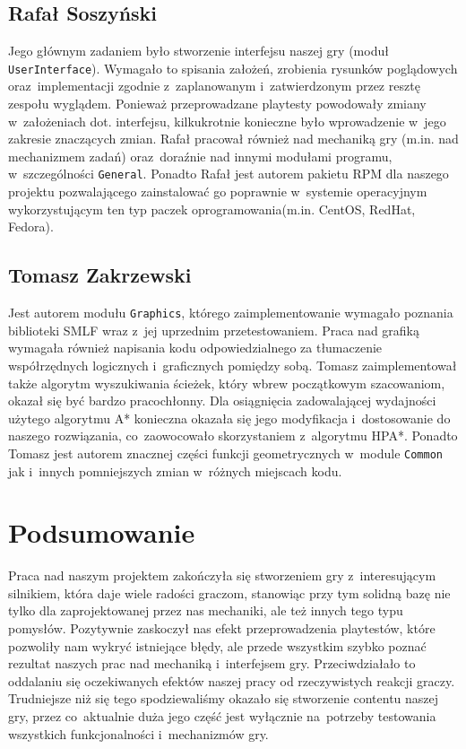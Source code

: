 \documentclass[licencjacka]{pracamgr}
\begin{document}
  \section{Rafał Soszyński}
    Jego głównym zadaniem było stworzenie interfejsu naszej gry (moduł \texttt{UserInterface}). Wymagało to spisania
    założeń, zrobienia rysunków poglądowych oraz~implementacji zgodnie z~zaplanowanym i~zatwierdzonym przez resztę zespołu
    wyglądem. Ponieważ przeprowadzane playtesty powodowały zmiany w~założeniach dot. interfejsu, kilkukrotnie konieczne
    było wprowadzenie w~jego zakresie znaczących zmian. Rafał pracował również nad mechaniką gry (m.in. nad mechanizmem
    zadań) oraz~doraźnie nad innymi modułami programu, w~szczególności \texttt{General}. Ponadto Rafał jest autorem pakietu
    RPM dla naszego projektu pozwalającego zainstalować go poprawnie w~systemie operacyjnym wykorzystującym ten typ paczek
    oprogramowania(m.in. CentOS, RedHat, Fedora).

  \section{Tomasz Zakrzewski}
    Jest autorem modułu \texttt{Graphics}, którego zaimplementowanie wymagało poznania biblioteki SMLF wraz z~jej uprzednim
    przetestowaniem. Praca nad grafiką wymagała również napisania kodu odpowiedzialnego za tłumaczenie współrzędnych
    logicznych i~graficznych pomiędzy sobą. Tomasz zaimplementował także algorytm wyszukiwania ścieżek, który wbrew
    początkowym szacowaniom, okazał się być bardzo pracochłonny. Dla osiągnięcia zadowalającej wydajności użytego algorytmu
    A* konieczna okazała się jego modyfikacja i~dostosowanie do naszego rozwiązania, co~zaowocowało skorzystaniem
    z~algorytmu HPA*. Ponadto Tomasz jest autorem znacznej części funkcji geometrycznych w~module \texttt{Common}
    jak i~innych pomniejszych zmian w~różnych miejscach kodu.

\chapter{Podsumowanie}
  Praca nad naszym projektem zakończyła się stworzeniem gry z~interesującym silnikiem, która daje wiele radości graczom,
  stanowiąc przy tym solidną bazę nie tylko dla zaprojektowanej przez nas mechaniki, ale też innych tego typu pomysłów.
  Pozytywnie zaskoczył nas efekt przeprowadzenia playtestów, które pozwoliły nam wykryć istniejące błędy, ale przede
  wszystkim szybko poznać rezultat naszych prac nad mechaniką i~interfejsem gry. Przeciwdziałało to oddalaniu się
  oczekiwanych efektów naszej pracy od rzeczywistych reakcji graczy. Trudniejsze niż się tego spodziewaliśmy okazało się
  stworzenie contentu naszej gry, przez co~aktualnie duża jego część jest wyłącznie na~potrzeby testowania wszystkich
  funkcjonalności i~mechanizmów gry. 
\end{document}
